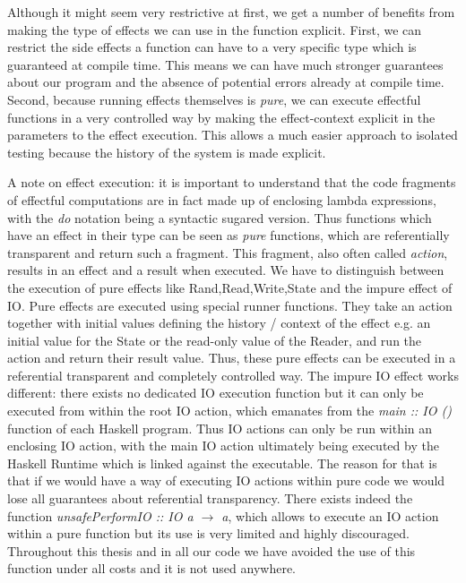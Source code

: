 \medskip

Although it might seem very restrictive at first, we get a number of benefits from making the type of effects we can use in the function explicit. First, we can restrict the side effects a function can have to a very specific type which is guaranteed at compile time. This means we can have much stronger guarantees about our program and the absence of potential errors already at compile time. Second, because running effects themselves is \textit{pure}, we can execute effectful functions in a very controlled way by making the effect-context explicit in the parameters to the effect execution. This allows a much easier approach to isolated testing because the history of the system is made explicit. 

A note on effect execution: it is important to understand that the code fragments of effectful computations are in fact  made up of enclosing lambda expressions, with the \textit{do} notation being a syntactic sugared version. Thus functions which have an effect in their type can be seen as \textit{pure} functions, which are referentially transparent and return such a fragment. This fragment, also often called \textit{action}, results in an effect and a result when executed. We have to distinguish between the execution of pure effects like Rand,Read,Write,State and the impure effect of IO. Pure effects are executed using special runner functions. They take an action together with initial values defining the history / context of the effect e.g. an initial value for the State or the read-only value of the Reader, and run the action and return their result value. Thus, these pure effects can be executed in a referential transparent and completely controlled way. The impure IO effect works different: there exists no dedicated IO execution function but it can only be executed from within the root IO action, which emanates from the \textit{main :: IO ()} function of each Haskell program. Thus IO actions can only be run within an enclosing IO action, with the main IO action ultimately being executed by the Haskell Runtime which is linked against the executable. The reason for that is that if we would have a way of executing IO actions within pure code we would lose all guarantees about referential transparency. There exists indeed the function \textit{unsafePerformIO :: IO a $\rightarrow$ a}, which allows to execute an IO action within a pure function but its use is very limited and highly discouraged. Throughout this thesis and in all our code we have avoided the use of this function under all costs and it is not used anywhere.

